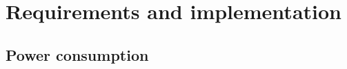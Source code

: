 \section{Requirements and implementation}\label{sec:requirements-and-implementation}

\subsection{Power consumption}\label{subsec:power-consumption}


